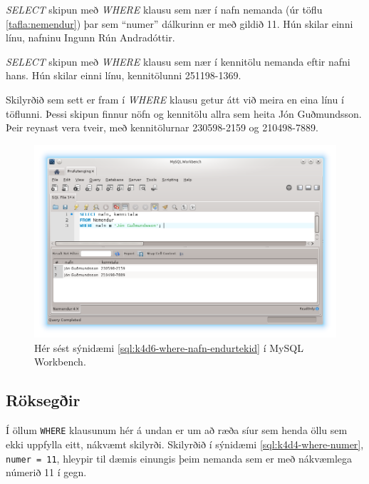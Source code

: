 \begin{example}
\caption[SELECT með WHERE klausu - eftir númeri]{\emph{SELECT} skipun með \emph{WHERE} klausu sem nær í nafn nemanda (úr töflu \ref{tafla:nemendur}) þar sem ``numer'' dálkurinn er með gildið 11. Hún skilar einni línu, nafninu Ingunn Rún Andradóttir.}
\label{sql:k4d4-where-numer}
\centering
{}
\end{example}

\begin{example}
\caption[SELECT með WHERE klausu - eftir nafni]{\emph{SELECT} skipun með \emph{WHERE} klausu sem nær í kennitölu nemanda eftir nafni hans. Hún skilar einni línu, kennitölunni 251198-1369.}
\label{sql:k4d5-where-nafn}
\centering
{}
\end{example}

\begin{example}
\caption[SELECT með WHERE klausu - endurtekin gildi]{Skilyrðið sem sett er fram í \emph{WHERE} klausu getur átt við meira en eina línu í töflunni. Þessi skipun finnur nöfn og kennitölu allra sem heita Jón Guðmundsson. Þeir reynast vera tveir, með kennitölurnar 230598-2159 og 210498-7889.}
\label{sql:k4d6-where-nafn-endurtekid}
\centering
{}
\end{example}

\begin{figure}[h]
\caption[Niðurstöður margra dálka SELECT í Workbench]{Hér sést sýnidæmi \ref{sql:k4d6-where-nafn-endurtekid} í MySQL Workbench.}
\label{mynd:workbench-nidurstada-jon}
\centering
\includegraphics[width=\linewidth]{myndir/workbench-nidurstada-jon}
\end{figure}
\subsection{Röksegðir}
Í öllum \verb|WHERE| klausunum hér á undan er um að ræða síur sem henda öllu sem ekki uppfylla eitt, nákvæmt skilyrði. Skilyrðið í sýnidæmi \ref{sql:k4d4-where-numer}, \verb|numer = 11|, hleypir til dæmis einungis þeim nemanda sem er með nákvæmlega númerið 11 í gegn.

